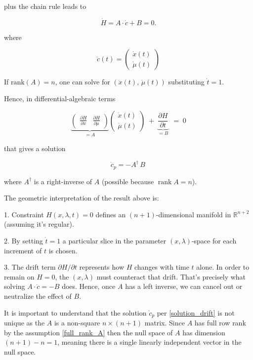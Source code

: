 \documentclass[11pt,american]{article}
\DeclareMathOperator{\rank}{\operatorname{rank}}
\theoremstyle{definition}
\theoremstyle{plain}
\theoremstyle{remark}
\begin{document}
plus the chain rule leads to

\[
\dot H = A \cdot \dot c + B = 0.
\]

where

\[
\dot c(t) = \begin{pmatrix} \dot{x}(t) \\ \dot{\mu}(t) \end{pmatrix}
\]
  
If $\mathrm{rank}(A)=n$, one can solve for $(\dot{x}(t),\,\dot{\mu}(t))$ substituting $\dot{t} = 1$.  

Hence, in differential-algebraic terms

\[
\underbrace{\begin{pmatrix}
\frac{\partial H}{\partial x} & \frac{\partial H}{\partial \mu}
\end{pmatrix}}_{=A}
\begin{pmatrix}
\dot{x}(t)\\[4pt]
\dot{\mu}(t)
\end{pmatrix}
\;+\;
\underbrace{\frac{\partial H}{\partial t}}_{=B}\
\;=\;
0
\]

that gives a solution

\begin{equation}\label{solution_drift}
\dot c_p = -A^\dagger\,B\,
\end{equation}

where $A^\dagger$ is a right-inverse of $A$ (possible because $\rank A=n$).

The geometric interpretation of the result above is:

1. Constraint $H(x,\lambda,t)=0$ defines an $(n+1)$-dimensional manifold in $\mathbb{R}^{n+2}$ (assuming it’s regular). 
 
2. By setting $\dot{t}=1$ a particular slice in the parameter $(x,\lambda)$-space for each increment of $t$ is chosen.  

3. The drift term $\partial H/\partial t$ represents how $H$ changes with time $t$ alone. In order to remain on $H=0$, the $(x,\lambda)$ must counteract that drift. That’s precisely what solving $A \cdot \dot c = -B$ does. Hence, once $A$ has a left inverse, we can cancel out or neutralize the effect of $B$.

It is important to understand that the solution $\dot c_p$ per \eqref{solution_drift} is not unique as the $A$ is a non-square $ n \times (n+1) $ matrix.
Since $ A $ has full row rank by the assumption \eqref{full_rank_A} then the null space of $ A $ has dimension $ (n+1) - n = 1 $, meaning there is a single linearly independent vector in the null space. 
\end{document}
